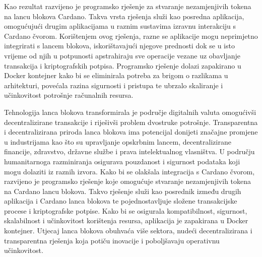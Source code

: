 \documentclass[times, utf8, diplomski]{fer}
\begin{document}
Kao rezultat razvijeno je programsko rješenje za stvaranje nezamjenjivih tokena na lancu blokova Cardano. Takva vrsta rješenja služi kao posredna aplikacija, omogućujući drugim aplikacijama u raznim sustavima izravnu interakciju s Cardano čvorom. Korištenjem ovog rješenja, razne se aplikacije mogu neprimjetno integrirati s lancem blokova, iskorištavajući njegove prednosti dok se u isto vrijeme od njih u potpunosti apstrahiraju sve operacije vezane uz obavljanje transakcija i kriptografskih potpisa. Programsko rješenje dolazi zapakirano u Docker kontejner kako bi se eliminirala potreba za brigom o razlikama u arhitekturi, povećala razina sigurnosti i pristupa te ubrzalo skaliranje i učinkovitost potrošnje računalnih resursa.




\begin{sazetak}

Tehnologija lanca blokova transformirala je područje digitalnih valuta omogućivši decentralizirane transakcije i riješivši problem dvostruke potrošnje. Transparentna i decentralizirana priroda lanca blokova ima potencijal donijeti značajne promjene u industrijama kao što su upravljanje opskrbnim lancem, decentralizirane financije, zdravstvo, državne službe i prava intelektualnog vlasništva. U području humanitarnoga razminiranja osigurava pouzdanost i sigurnost podataka koji mogu dolaziti iz raznih izvora. Kako bi se olakšala integracija s Cardano čvorom, razvijeno je programsko rješenje koje omogućuje stvaranje nezamjenjivih tokena na Cardano lancu blokova. Takvo rješenje služi kao posrednik između drugih aplikacija i Cardano lanca blokova te pojednostavljuje složene transakcijske procese i kriptografske potpise. Kako bi se osigurala kompatibilnost, sigurnost, skalabilnost i učinkovitost korištenja resursa, aplikacija je zapakirana u Docker kontejner. Utjecaj lanca blokova obuhvaća više sektora, nudeći decentralizirana i transparentna rješenja koja potiču inovacije i poboljšavaju operativnu učinkovitost.

\end{sazetak}

\newpage
\end{document}

